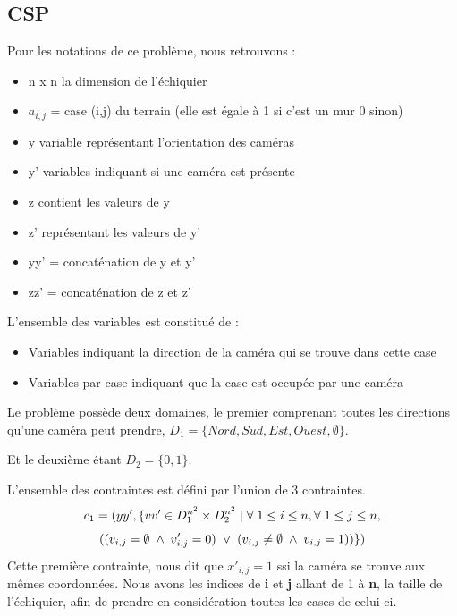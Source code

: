 \documentclass{article}
\begin{document}
\subsection{CSP}
Pour les notations de ce problème, nous retrouvons : 
\begin{itemize}
\item n x n la dimension de l'échiquier
\item $a_{i,j}$ = case (i,j) du terrain (elle est égale à 1 si c'est un mur 0 sinon)
\item y variable représentant l'orientation des caméras
\item y' variables indiquant si une caméra est présente
\item z contient les valeurs de y
\item z' représentant les valeurs de y'
\item yy' = concaténation de y et y'
\item zz' = concaténation de z et z'\\
\end{itemize}

L'ensemble des variables est constitué de :
\begin{itemize}
\item Variables indiquant la direction de la caméra qui se trouve dans cette case
\item Variables par case indiquant que la case est occupée par une caméra\\
\end{itemize}

Le problème possède deux domaines, le premier comprenant toutes les directions qu'une caméra peut prendre, $D_1 = \{Nord, Sud, Est, Ouest, \emptyset\}$. 

Et le deuxième étant $D_2 = \{0,1\}$.

L'ensemble des contraintes est défini par l'union de 3 contraintes.
  $$c_{1} = ( yy', \{ vv' \in  D_1^{n^2} \times D_2^{n^2} \mid \forall \hspace{0.1cm} 1\leq i \leq n, \forall \hspace{0.1cm} 1\leq j \leq n,$$
  $$((v_{i,j} = \emptyset \hspace{0.1cm} \wedge \hspace{0.1cm} v'_{i,j} = 0)
   \hspace{0.1cm} \vee \hspace{0.1cm}
  (v_{i,j}  \neq \emptyset \hspace{0.1cm}\wedge \hspace{0.1cm} v_{i,j} = 1)) \} ) $$
Cette première contrainte, nous dit que $x'_{i,j} = 1$ ssi la caméra se trouve aux mêmes coordonnées. Nous avons les indices de \textbf{i} et \textbf{j} allant de 1 à \textbf{n}, la taille de l'échiquier, afin de prendre en considération toutes les cases de celui-ci. 
\end{document}
